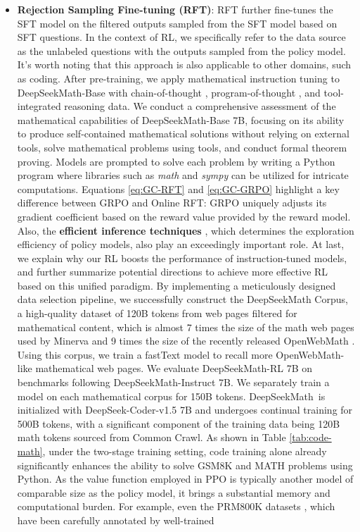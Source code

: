 \begin{itemize}[topsep=0pt]
\begin{itemize}[topsep=0pt]
\begin{itemize}[topsep=0pt]
We demonstrate RL works pretty well in mathematical reasoning tasks. To this end, we will explore the reinforcement learning algorithm that is robust against noisy reward signals. \item \textbf{Rejection Sampling Fine-tuning (RFT)}: RFT further fine-tunes the SFT model on the filtered outputs sampled from the SFT model based on SFT questions. In the context of RL, we specifically refer to the data source as the unlabeled questions with the outputs sampled from the policy model. It's worth noting that this approach is also applicable to other domains, such as coding. After pre-training, we apply mathematical instruction tuning to DeepSeekMath-Base with chain-of-thought \citep{cot}, program-of-thought \citep{pot,pal}, and tool-integrated reasoning \citep{tora} data. We conduct a comprehensive assessment of the mathematical capabilities of DeepSeekMath-Base 7B, focusing on its ability to produce self-contained mathematical solutions without relying on external tools, solve mathematical problems using tools, and conduct formal theorem proving. Models are prompted to solve each problem by writing a Python program where libraries such as \textit{math} and \textit{sympy} can be utilized for intricate computations. Equations \ref{eq:GC-RFT} and \ref{eq:GC-GRPO} highlight a key difference between GRPO and Online RFT: GRPO uniquely adjusts its gradient coefficient based on the reward value provided by the reward model. Also, the  \textbf{efficient inference techniques} \citep{xia-etal-2023-speculative,leviathan2023fast,kwon2023efficient,xia2024unlocking}, which determines the exploration efficiency of policy models, also play an exceedingly important role. At last, we explain why our RL boosts the performance of instruction-tuned models, and further summarize potential directions to achieve more effective RL based on this unified paradigm. By implementing a meticulously designed data selection pipeline, we successfully construct the DeepSeekMath Corpus, a high-quality dataset of 120B tokens from web pages filtered for mathematical content, which is almost 7 times the size of the math web pages used by Minerva \citep{minerva} and 9 times the size of the recently released OpenWebMath \citep{openwebmath}. Using this corpus, we train a fastText model \citep{joulin2016fasttext} to recall more OpenWebMath-like mathematical web pages. We evaluate DeepSeekMath-RL 7B on benchmarks following DeepSeekMath-Instruct 7B. We separately train a model on each mathematical corpus for 150B tokens. DeepSeekMath~is initialized with DeepSeek-Coder-v1.5 7B and undergoes continual training for 500B tokens, with a significant component of the training data being 120B math tokens sourced from Common Crawl. As shown in Table \ref{tab:code-math}, under the two-stage training setting, code training alone already significantly enhances the ability to solve GSM8K and MATH problems using Python. As the value function employed in PPO is typically another model of comparable size as the policy model, it brings a substantial memory and computational burden. For example, even the PRM800K datasets \citep{lightman2023let}, which have been carefully annotated by well-trained 
\end{itemize}
\end{itemize}
\end{itemize}

